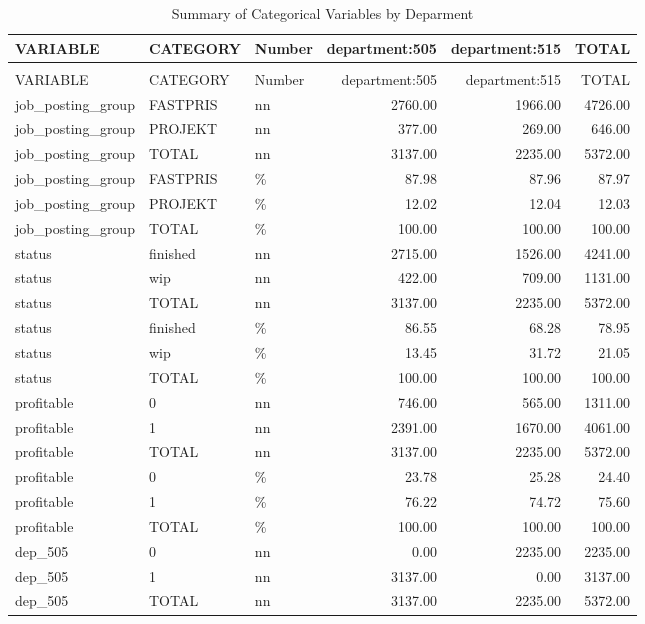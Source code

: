 \begingroup\fontsize{9}{11}\selectfont

\begin{longtable}[t]{lllrrr}
\caption{Summary of Categorical Variables by Deparment}\\
\toprule
VARIABLE & CATEGORY & Number & department:505 & department:515 & TOTAL\\
\midrule
\endfirsthead
\caption[]{Summary of Categorical Variables by Deparment }\\
\toprule
VARIABLE & CATEGORY & Number & department:505 & department:515 & TOTAL\\
\midrule
\endhead

\endfoot
\bottomrule
\endlastfoot
job\_posting\_group & FASTPRIS & nn & 2760.00 & 1966.00 & 4726.00\\
job\_posting\_group & PROJEKT & nn & 377.00 & 269.00 & 646.00\\
job\_posting\_group & TOTAL & nn & 3137.00 & 2235.00 & 5372.00\\
job\_posting\_group & FASTPRIS & \% & 87.98 & 87.96 & 87.97\\
job\_posting\_group & PROJEKT & \% & 12.02 & 12.04 & 12.03\\
job\_posting\_group & TOTAL & \% & 100.00 & 100.00 & 100.00\\
status & finished & nn & 2715.00 & 1526.00 & 4241.00\\
status & wip & nn & 422.00 & 709.00 & 1131.00\\
status & TOTAL & nn & 3137.00 & 2235.00 & 5372.00\\
status & finished & \% & 86.55 & 68.28 & 78.95\\
status & wip & \% & 13.45 & 31.72 & 21.05\\
status & TOTAL & \% & 100.00 & 100.00 & 100.00\\
profitable & 0 & nn & 746.00 & 565.00 & 1311.00\\
profitable & 1 & nn & 2391.00 & 1670.00 & 4061.00\\
profitable & TOTAL & nn & 3137.00 & 2235.00 & 5372.00\\
profitable & 0 & \% & 23.78 & 25.28 & 24.40\\
profitable & 1 & \% & 76.22 & 74.72 & 75.60\\
profitable & TOTAL & \% & 100.00 & 100.00 & 100.00\\
dep\_505 & 0 & nn & 0.00 & 2235.00 & 2235.00\\
dep\_505 & 1 & nn & 3137.00 & 0.00 & 3137.00\\
dep\_505 & TOTAL & nn & 3137.00 & 2235.00 & 5372.00\\

\end{longtable}
